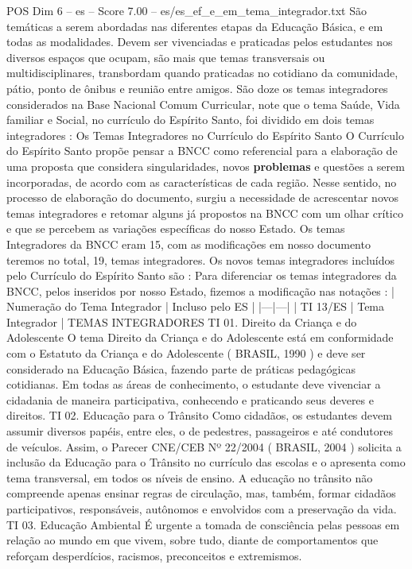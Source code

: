 \begin{textsample}{POS Dim 6 – es – Score 7.00 – es/es\_ef\_e\_em\_tema\_integrador.txt}
São temáticas a serem abordadas nas diferentes etapas da Educação Básica, e em todas as modalidades.
Devem ser vivenciadas e praticadas pelos estudantes nos diversos espaços que ocupam, são mais que temas transversais ou multidisciplinares, transbordam quando praticadas no cotidiano da comunidade, pátio, ponto de ônibus e reunião entre amigos.
São doze os temas integradores considerados na Base Nacional Comum Curricular, note que o tema Saúde, Vida familiar e Social, no currículo do Espírito Santo, foi dividido em dois temas integradores : Os Temas Integradores no Currículo do Espírito Santo O Currículo do Espírito Santo propõe pensar a BNCC como referencial para a elaboração de uma proposta que considera singularidades, novos \textbf{problemas} e questões a serem incorporadas, de acordo com as características de cada região.
Nesse sentido, no processo de elaboração do documento, surgiu a necessidade de acrescentar novos temas integradores e retomar alguns já propostos na BNCC com um olhar crítico e que se percebem as variações específicas do nosso Estado.
Os temas Integradores da BNCC eram 15, com as modificações em nosso documento teremos no total, 19, temas integradores.
Os novos temas integradores incluídos pelo Currículo do Espírito Santo são : Para diferenciar os temas integradores da BNCC, pelos inseridos por nosso Estado, fizemos a modificação nas notações : | Numeração do Tema Integrador | Incluso pelo ES | |---|---| | TI 13/ES | Tema Integrador | TEMAS INTEGRADORES TI 01.
Direito da Criança e do Adolescente O tema Direito da Criança e do Adolescente está em conformidade com o Estatuto da Criança e do Adolescente ( BRASIL, 1990 ) e deve ser considerado na Educação Básica, fazendo parte de práticas pedagógicas cotidianas.
Em todas as áreas de conhecimento, o estudante deve vivenciar a cidadania de maneira participativa, conhecendo e praticando seus deveres e direitos.
TI 02.
Educação para o Trânsito Como cidadãos, os estudantes devem assumir diversos papéis, entre eles, o de pedestres, passageiros e até condutores de veículos.
Assim, o Parecer CNE/CEB Nº 22/2004 ( BRASIL, 2004 ) solicita a inclusão da Educação para o Trânsito no currículo das escolas e o apresenta como tema transversal, em todos os níveis de ensino.
A educação no trânsito não compreende apenas ensinar regras de circulação, mas, também, formar cidadãos participativos, responsáveis, autônomos e envolvidos com a preservação da vida.
TI 03.
Educação Ambiental É urgente a tomada de consciência pelas pessoas em relação ao mundo em que vivem, sobre tudo, diante de comportamentos que reforçam desperdícios, racismos, preconceitos e extremismos.

\end{textsample}
